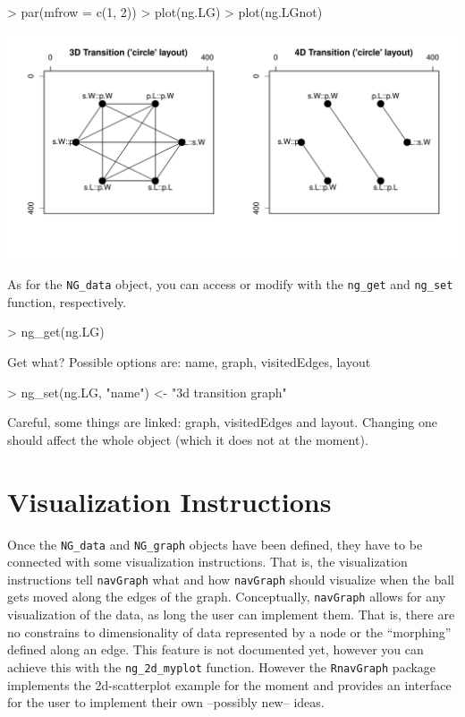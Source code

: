 \documentclass[12pt,oneside,titlepage,letter]{article}
\newcommand{\modify}[1]{{\color{blue}#1}}
\begin{document}
\begin{center}
\begin{Schunk}
\begin{Sinput}
> par(mfrow = c(1, 2))
> plot(ng.LG)
> plot(ng.LGnot)
\end{Sinput}
\end{Schunk}
\includegraphics{sweave_p-047}
\end{center}

As for the \texttt{NG\_data} object, you can access or modify with the \texttt{ng\_get} and \texttt{ng\_set} function, respectively.
\begin{Schunk}
\begin{Sinput}
> ng_get(ng.LG)
\end{Sinput}
\begin{Soutput}
Get what? Possible options are: name, graph, visitedEdges, layout
\end{Soutput}
\begin{Sinput}
> ng_set(ng.LG, "name") <- "3d transition graph"
\end{Sinput}
\end{Schunk}
\modify{Careful, some things are linked: graph, visitedEdges and layout. Changing one should affect the whole object (which it does not at the moment)}.

\section{Visualization Instructions}
Once the \texttt{NG\_data} and \texttt{NG\_graph} objects have been defined, they have to be connected with some visualization instructions. That is, the visualization instructions tell \texttt{navGraph} what and how \texttt{navGraph} should visualize when the ball gets moved along the edges of the graph. Conceptually, \texttt{navGraph} allows for any visualization of the data, as long the user can implement them. That is, there are no constrains to dimensionality of data represented by a node or the ``morphing'' defined along an edge. \modify{This feature is not documented yet, however you can achieve this with the \texttt{ng\_2d\_myplot} function}. However the \texttt{RnavGraph} package implements the 2d-scatterplot example \modify{for the moment} and provides an interface for the user to implement their own --possibly new-- ideas.\\
\end{document}
